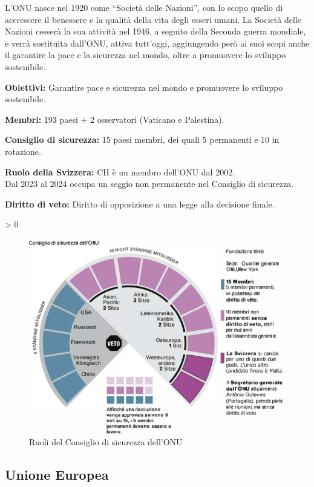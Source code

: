 \documentclass{article}
\makeatletter
\newcommand{\wrapfill}{
    \par
    \ifnum \value{WF@wrappedlines} > 0
        \addtocounter{WF@wrappedlines}{-1}%
        \null\vspace{
            \arabic{WF@wrappedlines}
            \baselineskip
        }
        \WFclear
    \fi
    \phantom{}
}
\makeatother
\begin{document}
L'ONU nasce nel 1920 come ``Società delle Nazioni'', con lo scopo quello di accrescere il
benessere e la qualità della vita degli esseri umani.
La Società delle Nazioni cesserà la sua attività nel 1946, a seguito della Seconda guerra
mondiale, e verrà sostituita dall'ONU, attiva tutt'oggi, aggiungendo però ai suoi scopi anche
il garantire la pace e la sicurezza nel mondo, oltre a promuovere lo sviluppo sostenibile.

\textbf{Obiettivi:} Garantire pace e sicurezza nel mondo e promuovere lo sviluppo
    sostenibile.

\textbf{Membri:} 193 paesi + 2 osservatori (Vaticano e Palestina).

\textbf{Consiglio di sicurezza:} 15 paesi membri, dei quali 5 permanenti e 10 in rotazione.

\textbf{Ruolo della Svizzera:} CH è un membro dell'ONU dal 2002.\\
    Dal 2023 al 2024 occupa un seggio non permanente nel Consiglio di sicurezza.

\textbf{Diritto di veto:} Diritto di opposizione a una legge alla decisione finale.
\wrapfill

\begin{figure}
    \begin{center}
        \includegraphics[width=.75\textwidth]{media/ONU.png}
    \end{center}
    \caption*{Ruoli del Consiglio di sicurezza dell'ONU}
\end{figure}

\subsection{Unione Europea}
\end{document}
